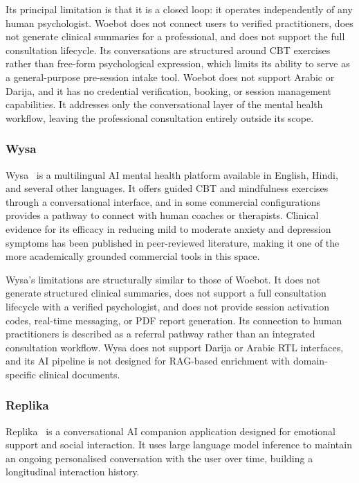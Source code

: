 \documentclass[a4paper,12pt]{report}
\begin{document}
Its principal limitation is that it is a closed loop: it operates independently of
any human psychologist. Woebot does not connect users to verified practitioners, does
not generate clinical summaries for a professional, and does not support the full
consultation lifecycle. Its conversations are structured around CBT exercises rather
than free-form psychological expression, which limits its ability to serve as a
general-purpose pre-session intake tool. Woebot does not support Arabic or Darija,
and it has no credential verification, booking, or session management capabilities.
It addresses only the conversational layer of the mental health workflow, leaving the
professional consultation entirely outside its scope.
 
\subsubsection{Wysa}
 
Wysa~\cite{Wysa2023} is a multilingual AI mental health platform available in English,
Hindi, and several other languages. It offers guided CBT and mindfulness exercises
through a conversational interface, and in some commercial configurations provides
a pathway to connect with human coaches or therapists. Clinical evidence for its
efficacy in reducing mild to moderate anxiety and depression symptoms has been
published in peer-reviewed literature, making it one of the more academically
grounded commercial tools in this space.
 
Wysa's limitations are structurally similar to those of Woebot. It does not generate
structured clinical summaries, does not support a full consultation lifecycle with
a verified psychologist, and does not provide session activation codes, real-time
messaging, or PDF report generation. Its connection to human practitioners is
described as a referral pathway rather than an integrated consultation workflow.
Wysa does not support Darija or Arabic RTL interfaces, and its AI pipeline is
not designed for RAG-based enrichment with domain-specific clinical documents.
 
\subsubsection{Replika}
 
Replika~\cite{Replika2023} is a conversational AI companion application designed for
emotional support and social interaction. It uses large language model inference to
maintain an ongoing personalised conversation with the user over time, building a
longitudinal interaction history.
 
\end{document}
